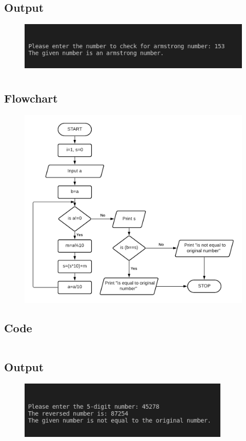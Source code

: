 \documentclass[12pt]{article}
\begin{document}
\subsection{Output}
\begin{figure}[h]
    \centering
    \includegraphics[width=1.0\textwidth]{4.png}
\end{figure}
\newpage
\section{}
\subsection{Flowchart}
\begin{figure}[h]
    \centering
    \includegraphics[width=1.1\textwidth]{Flowchart05.png}
\end{figure}
\newpage
\subsection{Code}
\inputminted{c}{q5.c}
\subsection{Output}
\begin{figure}[h]
    \centering
    \includegraphics[width=0.9\textwidth]{5.png}
\end{figure}
\newpage
\end{document}
